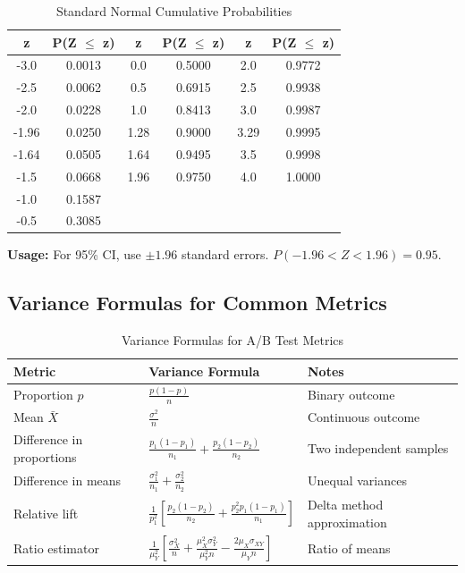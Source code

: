 \begin{table}[h]
\centering
\caption{Standard Normal Cumulative Probabilities}
\begin{tabular}{cccccc}
\toprule
\textbf{z} & \textbf{P(Z $\leq$ z)} & \textbf{z} & \textbf{P(Z $\leq$ z)} & \textbf{z} & \textbf{P(Z $\leq$ z)} \\
\midrule
-3.0 & 0.0013 & 0.0 & 0.5000 & 2.0 & 0.9772 \\
-2.5 & 0.0062 & 0.5 & 0.6915 & 2.5 & 0.9938 \\
-2.0 & 0.0228 & 1.0 & 0.8413 & 3.0 & 0.9987 \\
-1.96 & 0.0250 & 1.28 & 0.9000 & 3.29 & 0.9995 \\
-1.64 & 0.0505 & 1.64 & 0.9495 & 3.5 & 0.9998 \\
-1.5 & 0.0668 & 1.96 & 0.9750 & 4.0 & 1.0000 \\
-1.0 & 0.1587 & & & & \\
-0.5 & 0.3085 & & & & \\
\bottomrule
\end{tabular}
\end{table}

\textbf{Usage:} For 95\% CI, use $\pm 1.96$ standard errors. $P(-1.96 < Z < 1.96) = 0.95$.

\subsection{Variance Formulas for Common Metrics}

\begin{table}[h]
\centering
\caption{Variance Formulas for A/B Test Metrics}
\begin{tabular}{p{4cm}p{4cm}p{5cm}}
\toprule
\textbf{Metric} & \textbf{Variance Formula} & \textbf{Notes} \\
\midrule
Proportion $\hat{p}$ & $\frac{p(1-p)}{n}$ & Binary outcome \\[0.3cm]
Mean $\bar{X}$ & $\frac{\sigma^2}{n}$ & Continuous outcome \\[0.3cm]
Difference in proportions & $\frac{p_1(1-p_1)}{n_1} + \frac{p_2(1-p_2)}{n_2}$ & Two independent samples \\[0.3cm]
Difference in means & $\frac{\sigma_1^2}{n_1} + \frac{\sigma_2^2}{n_2}$ & Unequal variances \\[0.3cm]
Relative lift & $\frac{1}{p_1^2}\left[\frac{p_2(1-p_2)}{n_2} + \frac{p_2^2 p_1(1-p_1)}{n_1}\right]$ & Delta method approximation \\[0.3cm]
Ratio estimator & $\frac{1}{\mu_Y^2}\left[\frac{\sigma_X^2}{n} + \frac{\mu_X^2\sigma_Y^2}{\mu_Y^2 n} - \frac{2\mu_X\sigma_{XY}}{\mu_Y n}\right]$ & Ratio of means \\[0.3cm]
\bottomrule
\end{tabular}
\end{table}

